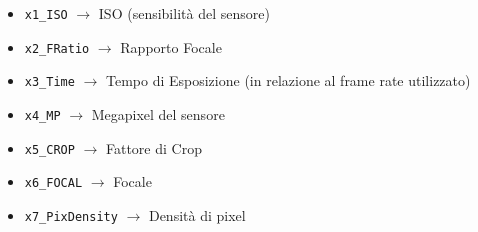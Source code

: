 \begin{itemize}
	\item \texttt{x1\_ISO} \quad $\rightarrow$ \quad ISO (sensibilità del sensore)
	\item \texttt{x2\_FRatio} \quad $\rightarrow$ \quad Rapporto Focale
	\item \texttt{x3\_Time} \quad $\rightarrow$ \quad Tempo di Esposizione (in relazione al frame rate utilizzato)
	\item \texttt{x4\_MP} \quad $\rightarrow$ \quad Megapixel del sensore
	\item \texttt{x5\_CROP} \quad $\rightarrow$ \quad Fattore di Crop
	\item \texttt{x6\_FOCAL} \quad $\rightarrow$ \quad Focale
	\item \texttt{x7\_PixDensity} \quad $\rightarrow$ \quad Densità di pixel
\end{itemize}


